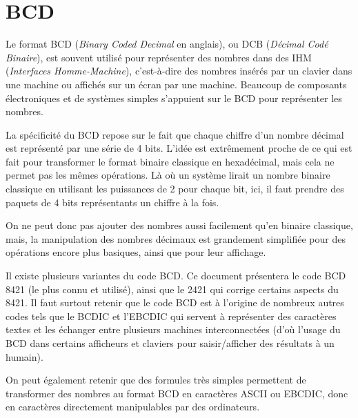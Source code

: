 \documentclass[11pt,a4paper]{article}
\begin{document}
\bigskip


\section{BCD}

\bigskip

Le format BCD (\textit{Binary Coded Decimal} en anglais), ou DCB (\textit{Décimal Codé Binaire}), est souvent utilisé pour représenter des nombres dans des IHM (\textit{Interfaces Homme-Machine}), c'est-à-dire des nombres insérés par un clavier dans une machine ou affichés sur un écran par une machine.
Beaucoup de composants électroniques et de systèmes simples s'appuient sur le BCD pour représenter les nombres.

\medskip

La spécificité du BCD repose sur le fait que chaque chiffre d'un nombre décimal est représenté par une série de 4 bits.
L'idée est extrêmement proche de ce qui est fait pour transformer le format binaire classique en hexadécimal, mais cela ne permet pas les mêmes opérations.
Là où un système lirait un nombre binaire classique en utilisant les puissances de 2 pour chaque bit, ici, il faut prendre des paquets de 4 bits représentants un chiffre à la fois.

On ne peut donc pas ajouter des nombres aussi facilement qu'en binaire classique, mais, la manipulation des nombres décimaux est grandement simplifiée pour des opérations encore plus basiques, ainsi que pour leur affichage.

\bigskip

Il existe plusieurs variantes du code BCD.
Ce document présentera le code BCD 8421 (le plus connu et utilisé), ainsi que le 2421 qui corrige certains aspects du 8421.
Il faut surtout retenir que le code BCD est à l'origine de nombreux autres codes tels que le BCDIC et l'EBCDIC qui servent à représenter des caractères textes et les échanger entre plusieurs machines interconnectées (d'où l'usage du BCD dans certains afficheurs et claviers pour saisir/afficher des résultats à un humain).

\medskip

On peut également retenir que des formules très simples permettent de transformer des nombres au format BCD en caractères ASCII ou EBCDIC, donc en caractères directement manipulables par des ordinateurs.
\end{document}
